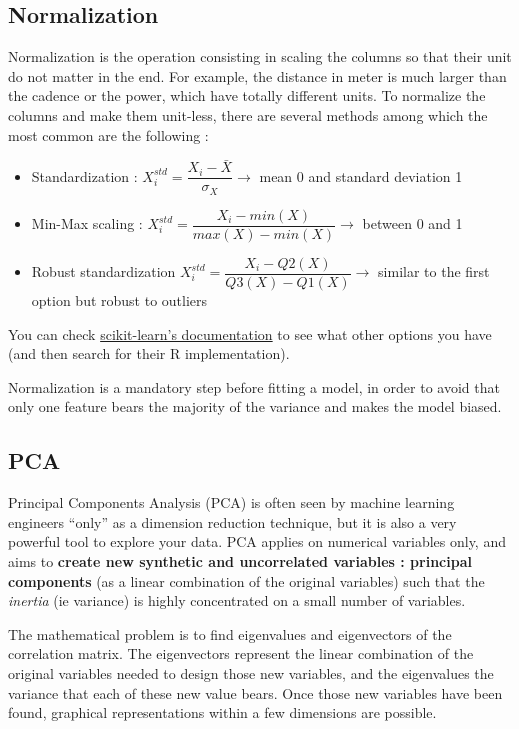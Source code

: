 \documentclass[
]{book}
\providecommand{\tightlist}{%
  \setlength{\itemsep}{0pt}\setlength{\parskip}{0pt}}
\begin{document}
\hypertarget{normalization}{%
\subsection{Normalization}\label{normalization}}

Normalization is the operation consisting in scaling the columns so that their unit do not matter in the end. For example, the distance in meter is much larger than the cadence or the power, which have totally different units. To normalize the columns and make them unit-less, there are several methods among which the most common are the following :

\begin{itemize}
\tightlist
\item
  Standardization : \(X_i^{std} = \dfrac{X_i-\bar{X}}{\sigma_X} \rightarrow\) mean 0 and standard deviation 1
\item
  Min-Max scaling : \(X_i^{std} = \dfrac{X_i-min(X)}{max(X)-min(X)} \rightarrow\) between 0 and 1
\item
  Robust standardization \(X_i^{std} = \dfrac{X_i-Q2(X)}{Q3(X)-Q1(X)} \rightarrow\) similar to the first option but robust to outliers
\end{itemize}

You can check \href{https://scikit-learn.org/stable/modules/classes.html\#module-sklearn.preprocessing}{scikit-learn's documentation} to see what other options you have (and then search for their R implementation).

Normalization is a mandatory step before fitting a model, in order to avoid that only one feature bears the majority of the variance and makes the model biased.

\hypertarget{pca}{%
\subsection{PCA}\label{pca}}

Principal Components Analysis (PCA) is often seen by machine learning engineers ``only'' as a dimension reduction technique, but it is also a very powerful tool to explore your data. PCA applies on numerical variables only, and aims to \textbf{create new synthetic and uncorrelated variables : principal components} (as a linear combination of the original variables) such that the \emph{inertia} (ie variance) is highly concentrated on a small number of variables.

The mathematical problem is to find eigenvalues and eigenvectors of the correlation matrix. The eigenvectors represent the linear combination of the original variables needed to design those new variables, and the eigenvalues the variance that each of these new value bears. Once those new variables have been found, graphical representations within a few dimensions are possible.
\end{document}
